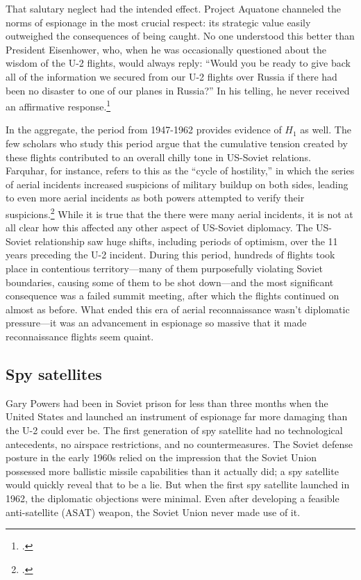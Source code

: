 \documentclass[14pt]{extarticle}
\begin{document}
That salutary neglect had the intended effect. Project Aquatone channeled the norms of espionage in the most crucial respect: its strategic value easily outweighed the consequences of being caught. No one understood this better than President Eisenhower, who, when he was occasionally questioned about the wisdom of the U-2 flights, would always reply: \enquote{Would you be ready to give back all of the information we secured from our U-2 flights over Russia if there had been no disaster to one of our planes in Russia?} In his telling, he never received an affirmative response.\footcite[p.~559]{eisenhower_waging_1965}

In the aggregate, the period from 1947-1962 provides evidence of $H_1$ as well. The few scholars who study this period argue that the cumulative tension created by these flights contributed to an overall chilly tone in US-Soviet relations. Farquhar, for instance, refers to this as the \enquote{cycle of hostility,} in which the series of aerial incidents increased suspicions of military buildup on both sides, leading to even more aerial incidents as both powers attempted to verify their suspicions.\footcite[p.~43]{farquhar_aerial_2015} While it is true that the there were many aerial incidents, it is not at all clear how this affected any other aspect of US-Soviet diplomacy. The US-Soviet relationship saw huge shifts, including periods of optimism, over the 11 years preceding the U-2 incident. During this period, hundreds of flights took place in contentious territory---many of them purposefully violating Soviet boundaries, causing some of them to be shot down---and the most significant consequence was a failed summit meeting, after which the flights continued on almost as before. What ended this era of aerial reconnaissance wasn't diplomatic pressure---it was an advancement in espionage so massive that it made reconnaissance flights seem quaint.

\subsection{Spy satellites}
Gary Powers had been in Soviet prison for less than three months when the United States and launched an instrument of espionage far more damaging than the U-2 could ever be. The first generation of spy satellite had no technological antecedents, no airspace restrictions, and no countermeasures. The Soviet defense posture in the early 1960s relied on the impression that the Soviet Union possessed more ballistic missile capabilities than it actually did; a spy satellite would quickly reveal that to be a lie. But when the first spy satellite launched in 1962, the diplomatic objections were minimal. Even after developing a feasible anti-satellite (ASAT) weapon, the Soviet Union never made use of it.
\end{document}
